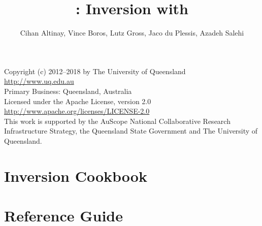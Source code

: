 \documentclass{esysdoc}
\begin{document}

\title{\downunder: Inversion with \escript}
\author{Cihan Altinay, Vince Boros, Lutz Gross, Jaco du Plessis, Azadeh Salehi}
\release{\relver}

\maketitle

\begin{center}
Copyright (c) 2012--2018 by The University of Queensland	\\
\url{http://www.uq.edu.au}				\\
Primary Business: Queensland, Australia			\\
Licensed under the Apache License, version 2.0	\\
\url{http://www.apache.org/licenses/LICENSE-2.0}	\\

This work is supported by the AuScope National Collaborative Research Infrastructure Strategy, 
the Queensland State Government and The University of Queensland.

\end{center}



\cleardoublepage{}%
\tableofcontents %
\cleardoublepage %

\pagestyle{fancy}



\part{Inversion Cookbook}\label{part1}





\part{Reference Guide}\label{part2}









\esysappendix
{}
%


\cleardoublepage
{}
{}
\printindex


\cleardoublepage{}
{}

\end{document}
